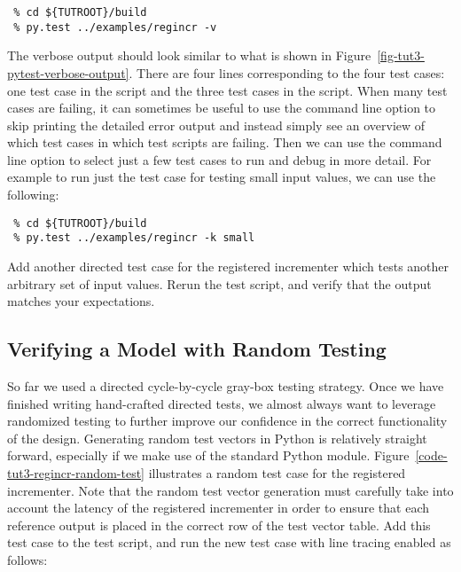 \documentclass{cbxdoc}
\begin{document}
\begin{verbatim}
 % cd ${TUTROOT}/build
 % py.test ../examples/regincr -v
\end{verbatim}

The verbose output should look similar to what is shown in
Figure~\ref{fig-tut3-pytest-verbose-output}. There are four lines
corresponding to the four test cases: one test case in the
 script and the three test cases in the
 script. When many test cases are failing, it
can sometimes be useful to use the  command line option to
skip printing the detailed error output and instead simply see an
overview of which test cases in which test scripts are failing. Then we
can use the  command line option to select just a few test cases
to run and debug in more detail. For example to run just the test case
for testing small input values, we can use the following:

\begin{verbatim}
 % cd ${TUTROOT}/build
 % py.test ../examples/regincr -k small
\end{verbatim}

\begin{task}
  Add another directed test case for the registered incrementer which
  tests another arbitrary set of input values. Rerun the test script, and
  verify that the output matches your expectations.
\end{task}

\subsection{Verifying a Model with Random Testing}



So far we used a directed cycle-by-cycle gray-box testing strategy. Once
we have finished writing hand-crafted directed tests, we almost always
want to leverage randomized testing to further improve our confidence in
the correct functionality of the design. Generating random test vectors
in Python is relatively straight forward, especially if we make use of
the standard Python  module.
Figure~\ref{code-tut3-regincr-random-test} illustrates a random test case
for the registered incrementer. Note that the random test vector
generation must carefully take into account the latency of the registered
incrementer in order to ensure that each reference output is placed in
the correct row of the test vector table. Add this test case to the
 test script, and run the new test case with
line tracing enabled as follows:
\end{document}
